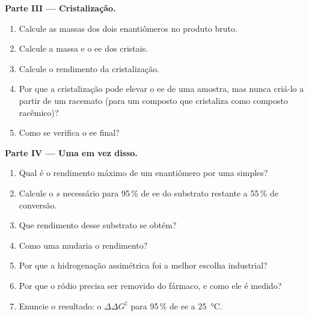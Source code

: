 \begin{problem}
\medskip\noindent\textbf{Parte III --- Cristalização.}
\begin{enumerate}[resume]
  \item Calcule as massas dos dois enantiômeros no produto bruto.
  \item Calcule a massa e o ee dos cristais.
  \item Calcule o rendimento da cristalização.
  \item Por que a cristalização pode elevar o ee de uma amostra, mas nunca criá-lo a partir de um
        racemato (para um composto que cristaliza como composto racêmico)?
  \item Como se verifica o ee final?
\end{enumerate}

\medskip\noindent\textbf{Parte IV --- Uma  em vez disso.}
\begin{enumerate}[resume]
  \item Qual é o rendimento máximo de um enantiômero por uma  simples?
  \item Calcule o $s$ necessário para 95\,\% de ee do substrato restante a 55\,\% de conversão.
  \item Que rendimento desse substrato se obtém?
  \item Como uma  mudaria o rendimento?
  \item Por que a hidrogenação assimétrica foi a melhor escolha industrial?
  \item Por que o ródio precisa ser removido do fármaco, e como ele é medido?
  \item Enuncie o resultado: o $\Delta\Delta G^\ddagger$ para 95\,\% de ee a \qty{25}{\celsius}.
\end{enumerate}
\end{problem}
